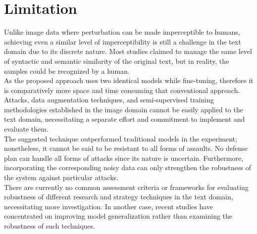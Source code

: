 \documentclass[%
	BCOR=8mm, %
	DIV=12,
	toc=bibliography, %
	toc=listof, %
	oneside, %
	egregdoesnotlikesansseriftitles, %
	]{scrbook}
\begin{document}
\section{Limitation}
\label{section:limitations}
Unlike image data where perturbation can be made imperceptible to humans, achieving even a similar level of imperceptibility is still a challenge in the text domain due to its discrete nature. Most studies claimed to manage the same level of syntactic and semantic similarity of the original text, but in reality, the samples could be recognized by a human.\\
As the proposed approach uses two identical models while fine-tuning, therefore it is comparatively more space and time consuming  that conventional approach. \\
Attacks, data augmentation techniques, and semi-supervised training methodologies established in the image domain cannot be easily applied to the text domain, necessitating a separate effort and commitment to implement and evaluate them.\\
The suggested technique outperformed traditional models in the experiment; nonetheless, it cannot be said to be resistant to all forms of assaults. No defense plan can handle all forms of attacks since its nature is uncertain. Furthermore, incorporating the corresponding noisy data can only strengthen the robustness of the system against particular attacks.\\
There are currently no common assessment criteria or frameworks for evaluating robustness of different research and strategy techniques in the text domain, necessitating more investigation. In another case, recent studies have concentrated on improving model generalization rather than examining the robustness of such techniques.
\end{document}
